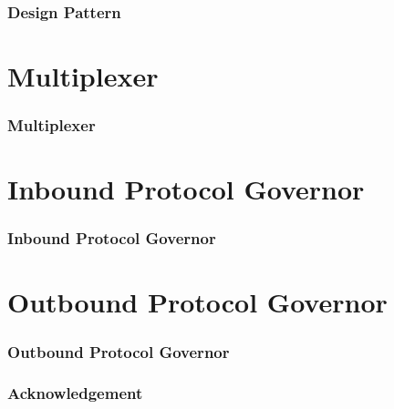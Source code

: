 \documentclass[t,dvipsnames,hyperref={colorlinks,citecolor=NavyBlue,linkcolor=NavyBlue,anchorcolor=NavyBlue,urlcolor=NavyBlue}]{beamer}
\begin{document}
\begin{frame}
  \frametitle{Design Pattern}
\end{frame}

\section{Multiplexer}

\begin{frame}
  \frametitle{Multiplexer}
\end{frame}

\section{Inbound Protocol Governor}

\begin{frame}
  \frametitle{Inbound Protocol Governor}
\end{frame}

\section{Outbound Protocol Governor}

\begin{frame}
  \frametitle{Outbound Protocol Governor}
\end{frame}


\begin{frame}
  \frametitle{Acknowledgement}
\end{frame}
\end{document}
